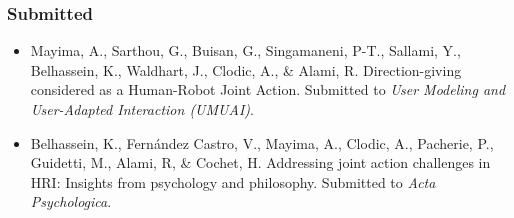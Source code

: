 \documentclass[a4paper,11pt,twoside]{StyleThese}
\begin{document}
\subsubsection*{Submitted}
\begin{itemize}
\item Mayima, A., Sarthou, G., Buisan, G., Singamaneni, P-T., Sallami, Y., Belhassein, K., Waldhart, J., Clodic, A., \& Alami, R. Direction-giving considered as a Human-Robot Joint
Action. Submitted to \textit{User Modeling and User-Adapted Interaction (UMUAI)}.

\item Belhassein, K., Fernández Castro, V., Mayima, A., Clodic, A., Pacherie, P., Guidetti, M., Alami, R, \& Cochet, H. Addressing joint action challenges in HRI: Insights from psychology
and philosophy. Submitted to \textit{Acta Psychologica}.
\end{itemize}	







 

\ifdefined{}
\else


\end{document}
